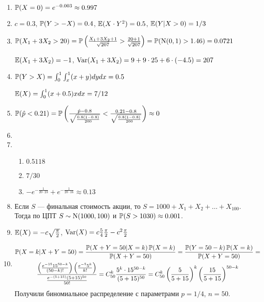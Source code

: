 \begin{enumerate}
\item $\P(X=0) = e^{-0.003} \approx 0.997$
\item $c=0.3$, $\P(Y > -X) = 0.4$, $\E(X\cdot Y^2) = 0.5$, $\E(Y|X>0) = 1/3$
\item $\P(X_1 +3X_2 > 20) = \P\left(\frac{X_1 +3X_2 +1}{\sqrt{207}}  > \frac{20+1}{\sqrt{207}}\right) = \P(\cN(0,1) > 1.46) = 0.0721$

$\E(X_1 +3X_2) = -1$, $\Var(X_1 +3X_2) = 9 + 9\cdot 25 +6 \cdot(-4.5) = 207$
\item $\P(Y > X) = \int_0^1 \int_x^1 (x+y) dy dx = 0.5$

$\E(X) = \int_0^1 (x+0.5)x dx = 7/12$


\item $\P(\hat{p} < 0.21) = \P\left(\frac{\hat{p} - 0.8}{\sqrt{\frac{0.8(1-0.8)}{200}}} < \frac{0.21 - 0.8}{\sqrt{\frac{0.8(1-0.8)}{200}}} \right) \approx 0$ %
\item
\item
\begin{enumerate}
\item $0.5118$
\item $7/30$
\item $-e^{-\frac{1}{20\cdot 23}} + e^{-\frac{1}{20\cdot 16}} \approx 0.13$
\end{enumerate}
\item Если $S$ — финальная стоимость акции, то $S=1000+X_1+X_2+\ldots+X_{100}$. Тогда по ЦПТ $S\sim \cN(1000,100)$ и $\P(S>1030)\approx 0.001$.
\item $\E(X) = -c \sqrt{\frac{\pi}{2}}$, $\Var(X) = c \frac{5}{4} \frac{\pi}{2} - c^2 \frac{\pi}{2}$
\item
\begin{multline*}
\P(X=k|X+Y=50) = \frac{\P(X+Y =50 | X=k)\P(X=k)}{\P(X+Y=50)} = \frac{\P(Y=50-k)\P(X=k)}{\P(X+Y=50)} = \\
\frac{\left(\frac{e^{-15} 15^{50-k}}{(50-k)!}\right) \left(\frac{e^{-5} 5^k}{k!}\right)}{\frac{e^{-(5+15)}(5+15)^{50}}{50!}} = C_{50}^k \frac{5^k \cdot 15^{50-k}}{(5+15)^{50}} = C_{50}^k \left(\frac{5}{5+15}\right)^k \left(\frac{15}{5+15}\right)^{50-k}
\end{multline*}
Получили биномиальное распределение с параметрами $p=1/4$, $n=50$.
\end{enumerate}



